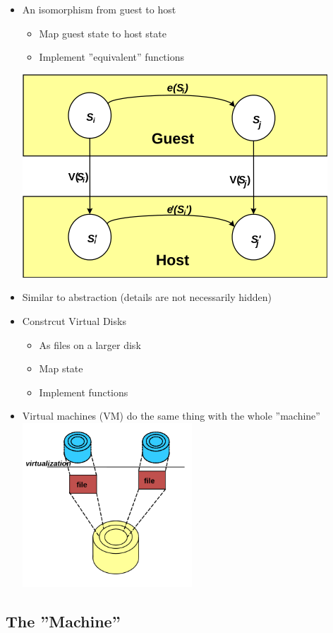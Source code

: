 \documentclass{scrartcl}
\begin{document}
\begin{itemize}
	\item An isomorphism from guest to host
	\begin{itemize}
		\item Map guest state to host state
		\item Implement ''equivalent'' functions
	\end{itemize}
	\includegraphics[width=.5\textwidth]{figures/VirtualizationGuestHost.png}
	\item Similar to abstraction (details are not necessarily hidden)
	\item Constrcut Virtual Disks
	\begin{itemize}
		\item As files on a larger disk
		\item Map state
		\item Implement functions
	\end{itemize}
	\item Virtual machines (VM) do the same thing with the whole ''machine'' \\
	
	\includegraphics[width=0.5\textwidth]{figures/VirtualizationVirtualDisks.png}
\end{itemize}

\subsection{The ''Machine''}
\end{document}
